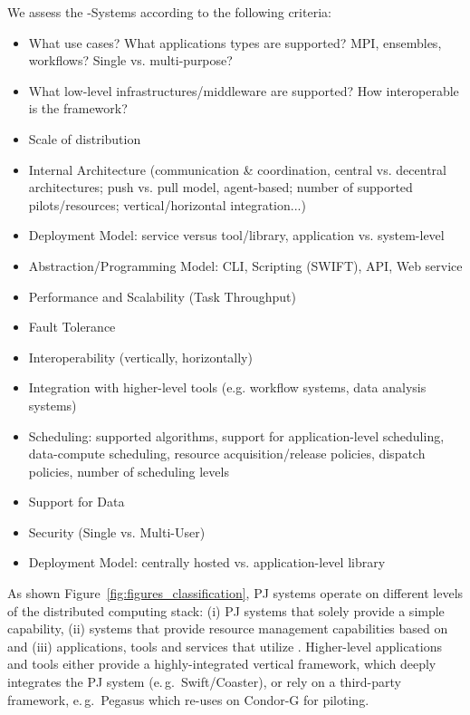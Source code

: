 \documentclass{sig-alternate}
\begin{document}
We assess the \pilotjob-Systems according to the following criteria:
\begin{itemize}
	\item What use cases? What applications types are supported? MPI, ensembles, workflows? Single vs. multi-purpose?
	\item What low-level infrastructures/middleware are supported? How interoperable is the framework?
	\item Scale of distribution
	\item Internal Architecture (communication \& coordination, central vs. decentral architectures; push vs. pull model, agent-based; number of supported pilots/resources; vertical/horizontal integration...)
	\item Deployment Model: service versus tool/library, application vs. system-level
    \item Abstraction/Programming Model: CLI, Scripting (SWIFT), API, Web service
	\item Performance and Scalability (Task Throughput)
	\item Fault Tolerance
	\item Interoperability (vertically, horizontally)
	\item Integration with higher-level tools (e.g. workflow systems, data analysis systems)
	\item Scheduling: supported algorithms, support for application-level 
	scheduling, data-compute scheduling, resource acquisition/release policies, dispatch policies, number of scheduling levels
	\item Support for Data
	\item Security (Single vs. Multi-User)
	\item Deployment Model: centrally hosted vs. application-level library
\end{itemize}

As shown Figure~\ref{fig:figures_classification}, PJ systems operate on
different levels of the distributed computing stack: (i) PJ systems that
solely provide a simple \pilot capability, (ii) systems that provide resource
management capabilities based on \pilots and (iii) applications, tools and
services that utilize \pilots. Higher-level applications and tools either 
provide a highly-integrated vertical framework, which deeply integrates the PJ 
system (e.\,g.\ Swift/Coaster), or rely on a third-party 
\pilotjob framework, e.\,g.\ Pegasus which re-uses on Condor-G for piloting.
\end{document}
